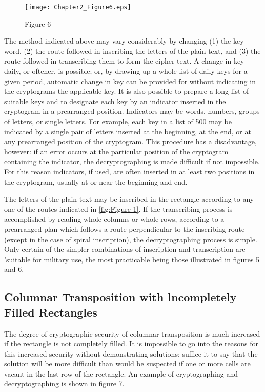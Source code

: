 \begin{figure}[h]
  \centering
    \texttt{[image: Chapter2\_Figure6.eps]}
    \label{fig:Figure 6}
    \caption{Figure 6}
\end{figure}


\mypara The method indicated above may vary considerably by changing
(1) the key word, (2) the route followed in inscribing the letters of the
plain text, and (3) the route followed in transcribing them to form the
cipher text. A change in key daily, or oftener, is possible; or, by drawing
up a whole list of daily keys for a given period, automatic change in key
can be provided for without indicating in the cryptograms the applicable
key. It is also possible to prepare a long list of suitable keys and to
designate each key by an indicator inserted in the cryptogram in a prearranged position. Indicators may be words, numbers, groups of letters,
or single letters. For example, each key in a list of 500 may be indicated
by a single pair of letters inserted at the beginning, at the end, or at any
prearranged position of the cryptogram. This procedure has a disadvantage, however: if an error occurs at the particular position of the cryptogram containing the indicator, the decryptographing is made difficult if
not impossible. For this reason indicators, if used, are often inserted
in at least two positions in the cryptogram, usually at or near the
beginning and end.

\mypara The letters of the plain text may be inscribed in the rectangle
according to any one of the routes indicated in \ref{fig:Figure 1}. If the transcribing process is accomplished by reading whole columns or whole
rows, according to a prearranged plan which follows a route perpendicular to the inscribing route (except in the case of spiral inscription), the
decryptographing process is simple. Only certain of the simpler combinations of inscription and transcription are 'suitable for military use, the
most practicable being those illustrated in figures 5 and 6.

\subsection{Columnar Transposition with lncompletely Filled Rectangles}

\mypara The degree of cryptographic security of columnar transposition is
much increased if the rectangle is not completely filled. It is impossible
to go into the reasons for this increased security without demonstrating
solutions; suffice it to say that the solution will be more difficult than
would be suspected if one or more cells are vacant in the last row of the
rectangle. An example of cryptographing and decryptographing is shown
in figure 7.

